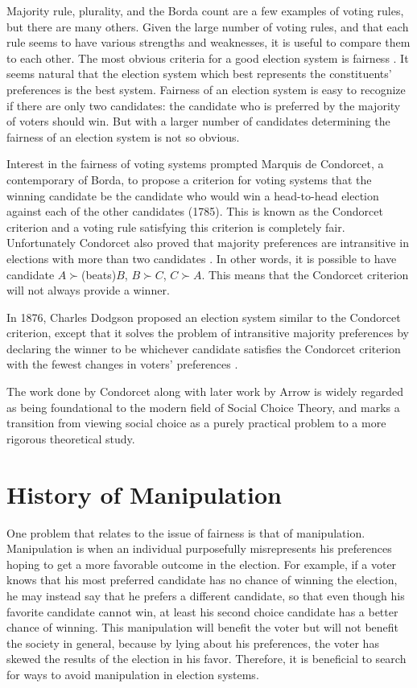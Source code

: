 	Majority rule, plurality, and the Borda count are a few examples of voting rules, but there are many others. Given the large number of voting rules, and that each rule seems to have various strengths and weaknesses, it is useful to compare them to each other. The most obvious criteria for a good election system is fairness \cite{chevaleyre2006issues}. It seems natural that the election system which best represents the constituents' preferences is the best system. Fairness of an election system is easy to recognize if there are only two candidates: the candidate who is preferred by the majority of voters should win. But with a larger number of candidates determining the fairness of an election system is not so obvious.

	Interest in the fairness of voting systems prompted Marquis de Condorcet, a contemporary of Borda, to propose a criterion for voting systems that the winning candidate be the candidate who would win a head-to-head election against each of the other candidates (1785). This is known as the Condorcet criterion and a voting rule satisfying this criterion is completely fair. Unfortunately Condorcet also proved that majority preferences are intransitive in elections with more than two candidates \cite{le1785essai, black1998theory}. In other words, it is possible to have candidate $A \succ $(beats)$ B$, $B \succ C$, $C \succ A$. This means that the Condorcet criterion will not always provide a winner.

	In 1876, Charles Dodgson proposed an election system similar to the Condorcet criterion, except that it solves the problem of intransitive majority preferences by declaring the winner to be whichever candidate satisfies the Condorcet criterion with the fewest changes in voters’ preferences \cite{dodgson1876method}.

	The work done by Condorcet along with later work by Arrow is widely regarded as being foundational to the modern field of Social Choice Theory, and marks a transition from viewing social choice as a purely practical problem to a more rigorous theoretical study.


\section{History of Manipulation}

	One problem that relates to the issue of fairness is that of manipulation. Manipulation is when an individual purposefully misrepresents his preferences hoping to get a more favorable outcome in the election. For example, if a voter knows that his most preferred candidate has no chance of winning the election, he may instead say that he prefers a different candidate, so that even though his favorite candidate cannot win, at least his second choice candidate has a better chance of winning. This manipulation will benefit the voter but will not benefit the society in general, because by lying about his preferences, the voter has skewed the results of the election in his favor. Therefore, it is beneficial to search for ways to avoid manipulation in election systems.

